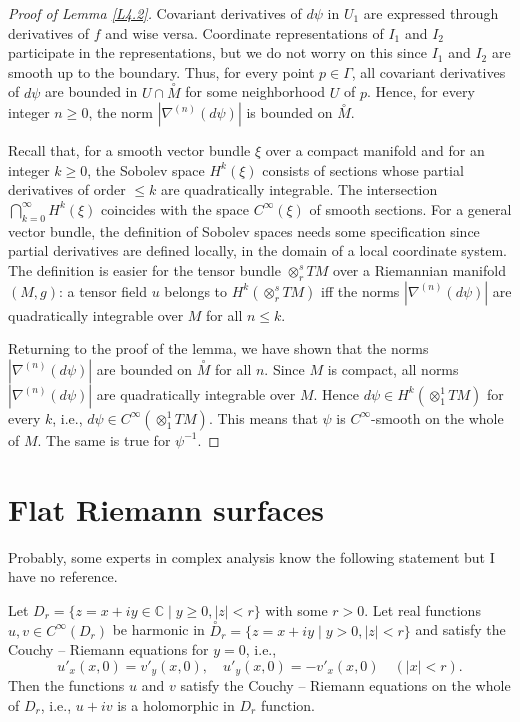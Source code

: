 \documentclass[12pt,reqno]{amsart}
\begin{document}
\begin{proof}[Proof of Lemma \ref{L4.2}]
Covariant derivatives of $d\psi$ in $U_1$ are expressed through derivatives of $f$ and wise versa. Coordinate representations of $I_1$ and $I_2$ participate in the representations, but we do not worry on this since $I_1$ and $I_2$ are smooth up to the boundary. Thus, for every point $p\in\Gamma$, all covariant derivatives of $d\psi$ are bounded in $U\cap\stackrel\circ M$ for some neighborhood $U$ of $p$. Hence, for every integer $n\ge0$, the norm $|\nabla^{(n)}(d\psi)|$ is bounded on $\stackrel\circ M$.

Recall that, for a smooth vector bundle $\xi$ over a compact manifold and for an integer $k\ge0$, the Sobolev space $H^k(\xi)$ consists of sections whose partial derivatives of order $\le k$ are quadratically integrable. The intersection $\bigcap_{k=0}^\infty H^k(\xi)$ coincides with the space $C^\infty(\xi)$ of smooth sections. For a general vector bundle, the definition of Sobolev spaces needs some specification since partial derivatives are defined locally, in the domain of a local coordinate system. The definition is easier for the tensor bundle $\otimes_r^sTM$ over a Riemannian manifold $(M,g)$: a tensor field $u$ belongs to $H^k(\otimes_r^sTM)$ iff the norms $|\nabla^{(n)}(d\psi)|$ are quadratically integrable over $M$ for all $n\le k$.

Returning to the proof of the lemma, we have shown that the norms $|\nabla^{(n)}(d\psi)|$ are bounded on $\stackrel\circ M$ for all $n$. Since $M$ is compact, all norms $|\nabla^{(n)}(d\psi)|$ are quadratically integrable over $M$. Hence $d\psi\in H^k(\otimes_1^1TM)$ for every $k$, i.e., $d\psi\in C^\infty(\otimes_1^1TM)$. This means that $\psi$ is $C^\infty$-smooth on the whole of $M$. The same is true for $\psi^{-1}$.
\end{proof}

\section{Flat Riemann surfaces}

Probably, some experts in complex analysis know the following statement but I have no reference.

\begin{lemma} \label{L5.1}
Let $D_r=\{z=x+iy\in{\mathbb C}\mid y\ge0,|z|<r\}$ with some $r>0$. Let real functions $u,v\in C^\infty(D_r)$ be harmonic in
${\stackrel\circ D}_r=\{z=x+iy\mid y>0,|z|<r\}$ and satisfy the Couchy -- Riemann equations for $y=0$, i.e.,
\begin{equation}
u'_x(x,0)=v'_y(x,0),\quad u'_y(x,0)=-v'_x(x,0)\quad(|x|<r).
                                \label{5.1}
\end{equation}
Then the functions $u$ and $v$ satisfy the Couchy -- Riemann equations on the whole of $D_r$, i.e., $u+iv$ is a holomorphic in $D_r$ function.
\end{lemma}
\end{document}
